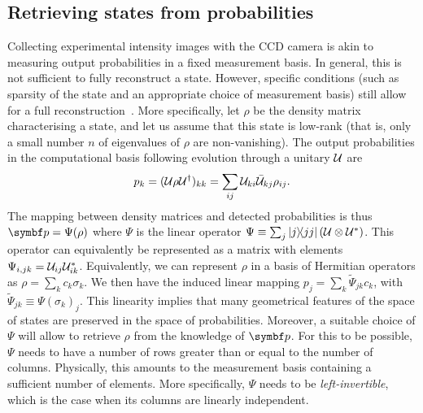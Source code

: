 \subsection{Retrieving states from probabilities}

Collecting experimental intensity images with the \ac{CCD} camera is akin to measuring output probabilities in a fixed measurement basis.
In general, this is not sufficient to fully reconstruct a state.
However, specific conditions (such as sparsity of the state and an appropriate choice of measurement basis) still allow for a full reconstruction~\cite{banchi2018multiphoton}.
More specifically, let $\rho$ be the density matrix characterising a state, and let us assume that this state is low-rank (that is, only a small number $n$ of eigenvalues of $\rho$ are non-vanishing).
The output probabilities in the computational basis following evolution through a unitary ${\mathcal{U}}$ are
\begin{equation}
	p_k = ({\mathcal{U}}\rho{\mathcal{U}}^\dagger)_{kk}
	    = \sum_{ij}{\mathcal{U}}_{ki}\bar{{\mathcal{U}}}_{kj}\rho_{ij}.
\end{equation}
The mapping between density matrices and detected probabilities is thus $\bs p=\Psi(\rho)$ where $\Psi$ is the linear operator
$\Psi\equiv\sum_j \ketbra{j}{jj}({\mathcal{U}}\otimes{\mathcal{U}}^*)$.
This operator can equivalently be represented as a matrix with elements
$\Psi_{i,jk} = {\mathcal{U}}_{ij}{\mathcal{U}}^*_{ik}$.
Equivalently, we can represent $\rho$ in a basis of Hermitian operators as $\rho=\sum_k c_k \sigma_k$. We then have the induced linear mapping $p_j = \sum_k \tilde\Psi_{jk}c_k$, with $\tilde\Psi_{jk}\equiv\Psi(\sigma_k)_j$.
This linearity implies that many geometrical features of the space of states are preserved in the space of probabilities. Moreover, a suitable choice of $\Psi$ will allow to retrieve $\rho$ from the knowledge of $\bs p$.
For this to be possible, $\Psi$ needs to have a number of rows greater than or equal to the number of columns. Physically, this amounts to the measurement basis containing a sufficient number of elements. More specifically, $\Psi$ needs to be \emph{left-invertible}, which is the case when its columns are linearly independent.

